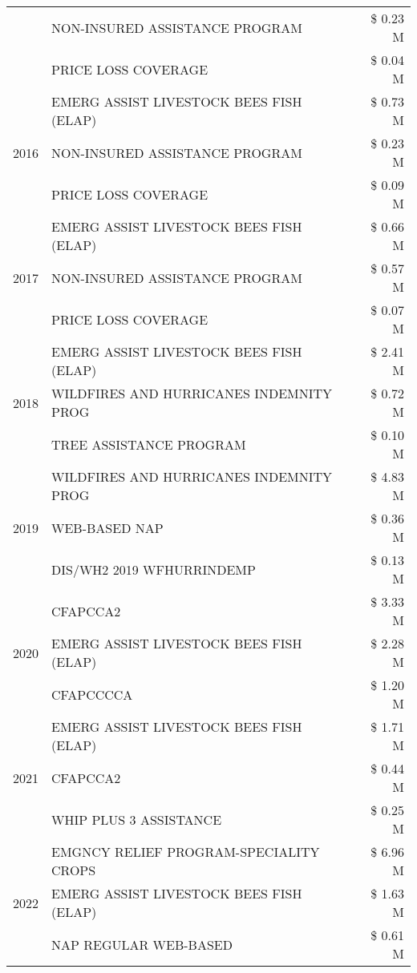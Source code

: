 \begin{tabular}{llr}
 & NON-INSURED ASSISTANCE PROGRAM & \$ 0.23 M \\
 & PRICE LOSS COVERAGE & \$ 0.04 M \\
\cline{1-3}
\multirow[t]{3}{*}{2016} & EMERG ASSIST LIVESTOCK BEES FISH (ELAP) & \$ 0.73 M \\
 & NON-INSURED ASSISTANCE PROGRAM & \$ 0.23 M \\
 & PRICE LOSS COVERAGE & \$ 0.09 M \\
\cline{1-3}
\multirow[t]{3}{*}{2017} & EMERG ASSIST LIVESTOCK BEES FISH (ELAP) & \$ 0.66 M \\
 & NON-INSURED ASSISTANCE PROGRAM & \$ 0.57 M \\
 & PRICE LOSS COVERAGE & \$ 0.07 M \\
\cline{1-3}
\multirow[t]{3}{*}{2018} & EMERG ASSIST LIVESTOCK BEES FISH (ELAP) & \$ 2.41 M \\
 & WILDFIRES AND HURRICANES INDEMNITY PROG & \$ 0.72 M \\
 & TREE ASSISTANCE PROGRAM & \$ 0.10 M \\
\cline{1-3}
\multirow[t]{3}{*}{2019} & WILDFIRES AND HURRICANES INDEMNITY PROG & \$ 4.83 M \\
 & WEB-BASED NAP & \$ 0.36 M \\
 & DIS/WH2 2019 WFHURRINDEMP & \$ 0.13 M \\
\cline{1-3}
\multirow[t]{3}{*}{2020} & CFAPCCA2 & \$ 3.33 M \\
 & EMERG ASSIST LIVESTOCK BEES FISH (ELAP) & \$ 2.28 M \\
 & CFAPCCCCA & \$ 1.20 M \\
\cline{1-3}
\multirow[t]{3}{*}{2021} & EMERG ASSIST LIVESTOCK BEES FISH (ELAP) & \$ 1.71 M \\
 & CFAPCCA2 & \$ 0.44 M \\
 & WHIP PLUS 3 ASSISTANCE & \$ 0.25 M \\
\cline{1-3}
\multirow[t]{3}{*}{2022} & EMGNCY RELIEF PROGRAM-SPECIALITY CROPS & \$ 6.96 M \\
 & EMERG ASSIST LIVESTOCK BEES FISH (ELAP) & \$ 1.63 M \\
 & NAP REGULAR WEB-BASED & \$ 0.61 M \\
\cline{1-3}
\bottomrule
\end{tabular}
